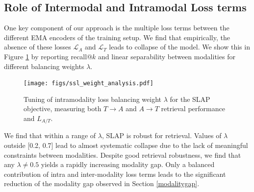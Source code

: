 \documentclass{article}
\begin{document}
\subsection{Role of Intermodal and Intramodal Loss terms}\label{subsection: role of intermodal and intramodal loss terms}

One key component of our approach is the multiple loss terms between the different EMA encoders of the training setup. We find that empirically, the absence of these losses $\mathcal{L}_A$ and $\mathcal{L}_T$ leads to collapse of the model.
We show this in Figure \ref{fig:intermodality loss} by reporting recall@$k$ and linear separability between modalities
for different balancing weights $\lambda$.%


\begin{figure}[h]
    \centering
    \texttt{[image: figs/ssl\_weight\_analysis.pdf]}
    \caption{Tuning of intramodality loss balancing weight $\lambda$ for the SLAP objective, measuring both $T\rightarrow A$ and $A\rightarrow T$ retrieval performance and $L_{A/T}$.}
    \label{fig:intermodality loss}
\end{figure}

We find that within a range of $\lambda$, SLAP is robust for retrieval. Values of $\lambda$ outside [0.2, 0.7] lead to almost systematic collapse due to the lack of meaningful constraints between modalities. Despite good retrieval robustness, we find that any $\lambda \neq 0.5$ yields a rapidly increasing modality gap. Only a balanced contribution of intra and inter-modality loss terms leads to the significant reduction of the modality gap observed in Section \ref{modalitygap}.


\end{document}
